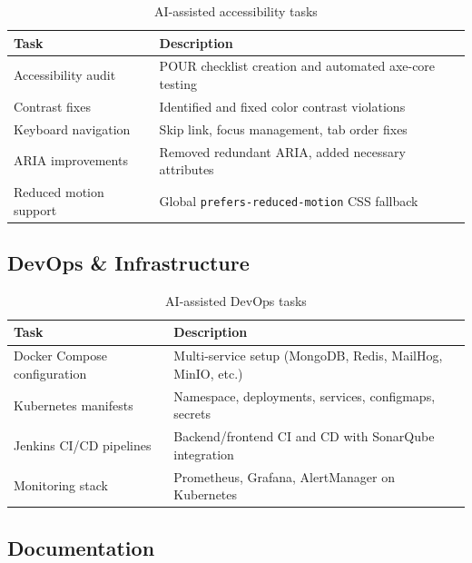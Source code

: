 \documentclass[12pt,a4paper]{article}
\begin{document}
\begin{table}[H]
\centering
\begin{tabularx}{\textwidth}{lX}
\toprule
\textbf{Task} & \textbf{Description} \\
\midrule
Accessibility audit      & POUR checklist creation and automated axe-core testing \\
Contrast fixes           & Identified and fixed color contrast violations \\
Keyboard navigation      & Skip link, focus management, tab order fixes \\
ARIA improvements        & Removed redundant ARIA, added necessary attributes \\
Reduced motion support   & Global \texttt{prefers-reduced-motion} CSS fallback \\
\bottomrule
\end{tabularx}
\caption{AI-assisted accessibility tasks}
\end{table}

\subsection{DevOps \& Infrastructure}

\begin{table}[H]
\centering
\begin{tabularx}{\textwidth}{lX}
\toprule
\textbf{Task} & \textbf{Description} \\
\midrule
Docker Compose configuration & Multi-service setup (MongoDB, Redis, MailHog, MinIO, etc.) \\
Kubernetes manifests         & Namespace, deployments, services, configmaps, secrets \\
Jenkins CI/CD pipelines      & Backend/frontend CI and CD with SonarQube integration \\
Monitoring stack             & Prometheus, Grafana, AlertManager on Kubernetes \\
\bottomrule
\end{tabularx}
\caption{AI-assisted DevOps tasks}
\end{table}

\subsection{Documentation}
\end{document}
